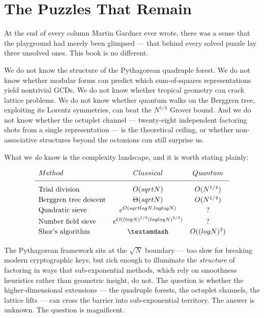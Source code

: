 \section*{The Puzzles That Remain}

At the end of every column Martin Gardner ever wrote, there was a sense that the playground had merely been glimpsed --- that behind every solved puzzle lay three unsolved ones. This book is no different.

We do not know the structure of the Pythagorean quadruple forest. We do not know whether modular forms can predict which sum-of-squares representations yield nontrivial GCDs. We do not know whether tropical geometry can crack lattice problems. We do not know whether quantum walks on the Berggren tree, exploiting its Lorentz symmetries, can beat the $N^{1/4}$ Grover bound. And we do not know whether the octuplet channel --- twenty-eight independent factoring shots from a single representation --- is the theoretical ceiling, or whether non-associative structures beyond the octonions can still surprise us.

What we \textit{do} know is the complexity landscape, and it is worth stating plainly:

\[
\begin{array}{lcc}
\textbf{Method} & \textbf{Classical} & \textbf{Quantum} \\[4pt]
\hline
\\[-6pt]
\text{Trial division} & O(\sqrt{N}) & O(N^{1/4}) \\[2pt]
\text{Berggren tree descent} & \Theta(\sqrt{N}) & O(N^{1/4}) \\[2pt]
\text{Quadratic sieve} & e^{O(\sqrt{\log N \cdot \log\log N})} & ? \\[2pt]
\text{Number field sieve} & e^{O((\log N)^{1/3}(\log\log N)^{2/3})} & ? \\[2pt]
\text{Shor's algorithm} & — & O((\log N)^3) \\[2pt]
\end{array}
\]

The Pythagorean framework sits at the $\sqrt{N}$ boundary --- too slow for breaking modern cryptographic keys, but rich enough to illuminate the \textit{structure} of factoring in ways that sub-exponential methods, which rely on smoothness heuristics rather than geometric insight, do not. The question is whether the higher-dimensional extensions --- the quadruple forests, the octuplet channels, the lattice lifts --- can cross the barrier into sub-exponential territory. The answer is unknown. The question is magnificent.

